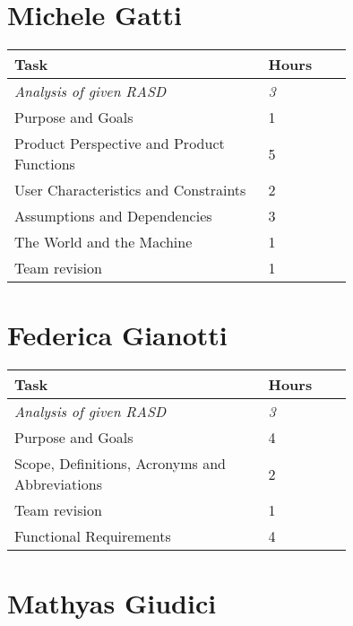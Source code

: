 \section{Michele Gatti}

\smallskip
\begin{center}
\begin{tabular}{ | p{0.75\linewidth} | l | }
  \hline
    \textbf{Task} & \textbf{Hours }\\ \hline
    \textit{Analysis of given RASD} & \textit{3} \\ \hline
    Purpose and Goals & 1 \\ \hline
    Product Perspective and Product Functions & 5 \\ \hline
    User Characteristics and Constraints & 2 \\ \hline
    Assumptions and Dependencies & 3 \\ \hline
    The World and the Machine & 1 \\ \hline
    Team revision & 1 \\ \hline
\end{tabular}
\end{center}
\smallskip


\section{Federica Gianotti}

\smallskip
\begin{center}
\begin{tabular}{ | p{0.75\linewidth} | l | }
  \hline
    \textbf{Task} & \textbf{Hours }\\ \hline
    \textit{Analysis of given RASD} & \textit{3} \\ \hline
    Purpose and Goals & 4 \\ \hline
    Scope, Definitions, Acronyms and Abbreviations & 2 \\ \hline
    Team revision & 1 \\ \hline
    Functional Requirements & 4 \\ \hline
\end{tabular}
\end{center}
\smallskip

\section{Mathyas Giudici}

